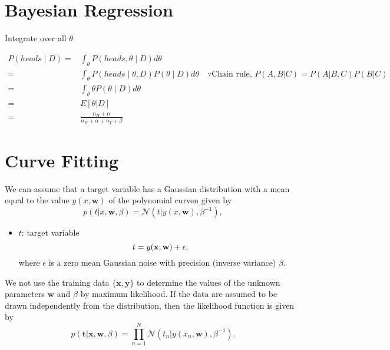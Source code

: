 \section{Bayesian Regression}
\label{sec:regression_bayes}

Integrate over all $\theta$

\begin{align}
P(heads \mid D) =& \int_{\theta} P(heads, \theta \mid D) d\theta\\
 =& \int_{\theta} P(heads \mid \theta, D) P(\theta \mid D) d\theta \quad \because  \textrm{Chain rule, } P(A,B|C)=P(A|B,C)P(B|C)\\ 
  =& \int_{\theta} \theta P(\theta \mid D) d\theta\\ 
  =&E\left[\theta|D\right]\\
 =&\frac{n_H + \alpha}{n_H + \alpha + n_T + \beta}
\end{align}


\section{Curve Fitting}
We can assume that a target variable has a Gaussian distribution with a mean equal to the value $y(x,\mathbf{w})$ of the polynomial curven given by
\begin{equation}
	p(t|x, \mathbf{w}, \beta) = \mathcal{N}(t|y(x,\mathbf{w}), \beta^{-1}),
	\label{eq:curve}
\end{equation}
\begin{itemize}
	\item $t$: target variable
		$$t = y({\mathbf{x}}, {\mathbf{w}}) +\epsilon,$$
	where $\epsilon$ is a zero mean Gaussian noise with precision (inverse variance) $\beta$. 
\end{itemize}

We not use the training data $\{\mathbf{x,y}\}$ to determine the values of the unknown parameters $\mathbf{w}$ and $\beta$ by maximum likelihood. If the data are assumed to be drawn independently from the distribution, then the likelihood function is given by 
\begin{equation}
	p(\mathbf{t}|\mathbf{x,w},\beta) = \prod_{n=1}^{N}\mathcal{N}(t_n|y(x_n,\mathbf{w}), \beta^{-1}).
	\label{eq:curve_ml}
\end{equation}

